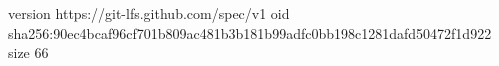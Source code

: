 version https://git-lfs.github.com/spec/v1
oid sha256:90ec4bcaf96cf701b809ac481b3b181b99adfc0bb198c1281dafd50472f1d922
size 66

